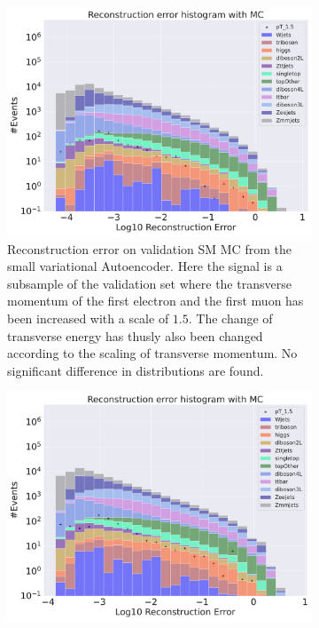 \begin{figure}[h!]
    \centering
    \begin{subfigure}{.45\textwidth}
        \includegraphics[width=\textwidth]{Figures/AE_testing/small/b_data_recon_big_rm3_feats_sig_pT_1.5.pdf}
        \caption{Reconstruction error on validation SM MC from the small variational Autoencoder. Here the signal is a subsample of the validation 
        set where the transverse momentum of the first electron and the first muon has been increased with a scale of $1.5$. The change of transverse 
        energy has thusly also been changed according to the scaling of transverse momentum. No significant difference in distributions are found. }
        \label{fig:ae_small_pt_1_5}
    \end{subfigure}
    \hfill 
    \begin{subfigure}{.45\textwidth}
        \includegraphics[width=\textwidth]{Figures/AE_testing/big/b_data_recon_big_rm3_feats_sig_pT_1.5.pdf}

\end{subfigure}
\end{figure}
